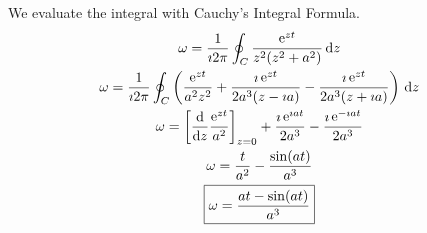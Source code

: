 {%
\begin{Solution}
  We evaluate the integral with Cauchy's Integral Formula.
  \begin{gather*}
    \omega = \frac{1}{\imath 2 \pi} \oint_C \frac{\mathop{\mathrm{e}}\nolimits^{z t}}{z^2 (z^2 + a^2)}\,\mathrm{d} z 
    \\
    \omega = \frac{1}{\imath 2 \pi} \oint_C \left( \frac{\mathop{\mathrm{e}}\nolimits^{z t}}{a^2 z^2} 
      + \frac{\imath \mathop{\mathrm{e}}\nolimits^{z t}}{2 a^3 (z - \imath a)} - \frac{\imath \mathop{\mathrm{e}}\nolimits^{z t}}{2 a^3 (z + \imath a)} 
    \right)\,\mathrm{d} z 
    \\
    \omega = \left[ \frac{\mathrm{d}}{\mathrm{d} z} \frac{\mathop{\mathrm{e}}\nolimits^{z t}}{a^2} \right]_{z = 0}
    + \frac{ \imath \mathop{\mathrm{e}}\nolimits^{\imath a t} }{ 2 a^3 } - \frac{ \imath \mathop{\mathrm{e}}\nolimits^{-\imath a t} }{ 2 a^3 } 
    \\
    \omega = \frac{t}{a^2} - \frac{ \sin(a t) }{ a^3 } 
    \\
    \boxed{
      \omega = \frac{a t - \sin(a t)}{a^3}
      }
  \end{gather*}
\end{Solution}












}
